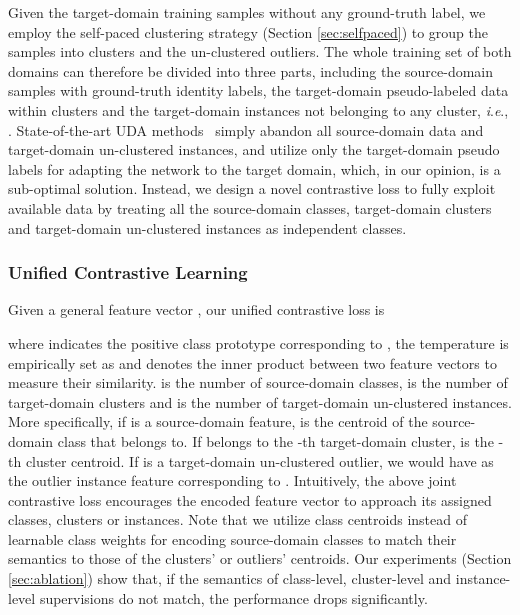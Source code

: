 \documentclass{article}
\newcommand{\ie}{\textit{i}.\textit{e}., }
\begin{document}
Given the target-domain training samples  without any ground-truth label, 
we employ 
the self-paced clustering strategy (Section \ref{sec:selfpaced}) to group the samples into clusters and the un-clustered outliers. 
The whole training set of both domains can therefore be divided into three parts, including the source-domain samples  with ground-truth identity labels, the target-domain pseudo-labeled data  within clusters and the target-domain instances  not belonging to any cluster, \ie . 
State-of-the-art UDA methods~\cite{ge2020mutual,zhai2020ad,yang2019selfsimilarity,zhang2019self} 
simply abandon all source-domain data and target-domain un-clustered instances, and 
utilize only the target-domain pseudo labels for adapting the network to the target domain, which, in our opinion, is a sub-optimal solution.
Instead, we design a novel contrastive loss to fully exploit available data  by treating all the source-domain classes, target-domain clusters and target-domain un-clustered instances as independent classes.  






\subsubsection{Unified Contrastive Learning} 
\vspace{-5pt}

Given a general feature vector , our unified contrastive loss is

where  indicates the positive class prototype corresponding to ,
the temperature  is empirically set as 
and  denotes the inner product between two feature vectors to measure their similarity. 
 is the number of source-domain classes,  is the number of target-domain clusters and  is the number of target-domain un-clustered instances.
More specifically, if  is a source-domain feature,  is the centroid of the source-domain class  that  belongs to. 
If  belongs to the -th target-domain cluster,  is the -th cluster centroid. 
If  is a target-domain un-clustered outlier, we would have  as the outlier instance feature corresponding to . Intuitively, the above joint contrastive loss encourages the encoded feature vector to approach its assigned classes, clusters or instances. 
Note that we utilize class centroids  instead of learnable class weights for encoding source-domain classes to match their semantics to those of the clusters' or outliers' centroids. Our experiments (Section \ref{sec:ablation}) show that, if the semantics of class-level, cluster-level and instance-level supervisions do not match, the performance drops significantly.
\end{document}
